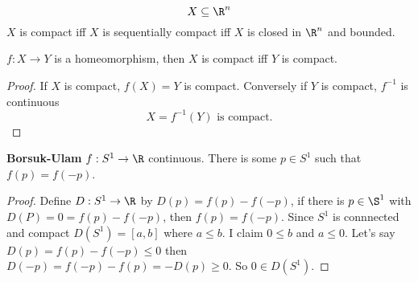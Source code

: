 \begin{theorem}
  $$X\subseteq \R^n$$
  $X$ is compact iff $X$ is sequentially compact iff $X$ is closed in $\R^n$ and bounded.
\end{theorem}

\begin{proposition}
  $f:X\to Y$ is a homeomorphism, then $X$ is compact iff $Y$ is compact.
\end{proposition}
\begin{proof}
  If $X$ is compact, $f(X)=Y$ is compact.
  \newline
  Conversely if $Y$ is compact, $f^{-1}$ is continuous
    $$X=f^{-1}(Y) \text{ is compact.}$$
\end{proof}

\begin{theorem}
  \textbf{Borsuk-Ulam}
  \newline
    $f:S^1\to \R$ continuous. There is some $p\in S^1$ such that $f(p)=f(-p)$.
\end{theorem}
\begin{proof}
  Define $D: S^1\to \R$ by $D(p)=f(p)-f(-p)$, if there is $p\in \S^1$ with $D(P)=0=f(p)-f(-p)$, then $f(p)=f(-p)$. Since $S^1$ is connnected and compact $D(S^1)=[a,b]$ where $a\leq b$.
  \newline
  I claim $0\leq b$ and $a \leq 0$. Let's say $D(p)=f(p)-f(-p)\leq 0$ then $D(-p)=f(-p)-f(p)=-D(p)\geq 0$. So $0\in D(S^1)$.
  \qedhere
\end{proof}
